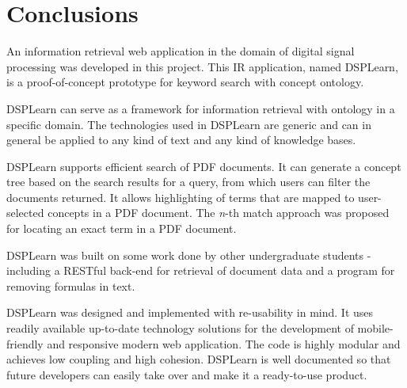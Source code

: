 \section{Conclusions}
An information retrieval web application in the domain of digital signal processing was developed in this project. This IR application, named DSPLearn, is a proof-of-concept prototype for keyword search with concept ontology.

DSPLearn can serve as a framework for information retrieval with ontology in a specific domain. The technologies used in DSPLearn are generic and can in general be applied to any kind of text and any kind of knowledge bases. 

DSPLearn supports efficient search of PDF documents. It can generate a concept tree based on the search results for a query, from which users can filter the documents returned. It allows highlighting of terms that are mapped to user-selected concepts in a PDF document. The \textit{n}-th match approach was proposed for locating an exact term in a PDF document.

DSPLearn was built on some work done by other undergraduate students - including a RESTful back-end for retrieval of document data and a program for removing formulas in text.

DSPLearn was designed and implemented with re-usability in mind. It uses readily available up-to-date technology solutions for the development of mobile-friendly and responsive modern web application. The code is highly modular and achieves low coupling and high cohesion. DSPLearn is well documented so that future developers can easily take over and make it a ready-to-use product.